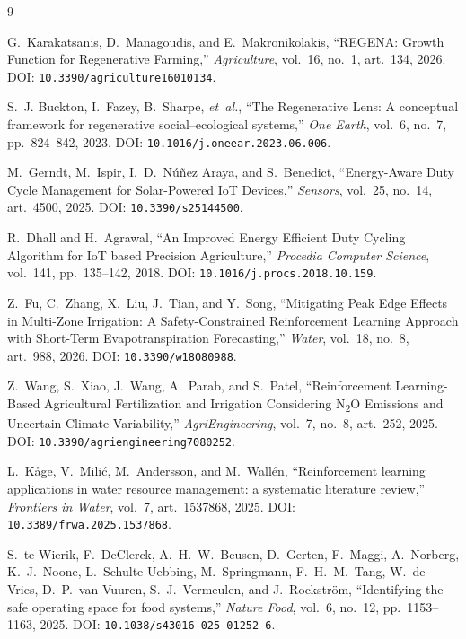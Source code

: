 \documentclass[11pt,a4paper]{article}
\begin{document}
\begin{thebibliography}{9}

G.~Karakatsanis, D.~Managoudis, and E.~Makronikolakis, ``REGENA: Growth Function for Regenerative Farming,'' \emph{Agriculture}, vol.~16, no.~1, art.~134, 2026. DOI: \texttt{10.3390/agriculture16010134}.

S.~J. Buckton, I.~Fazey, B.~Sharpe, \emph{et~al.}, ``The Regenerative Lens: A conceptual framework for regenerative social--ecological systems,'' \emph{One Earth}, vol.~6, no.~7, pp.~824--842, 2023. DOI: \texttt{10.1016/j.oneear.2023.06.006}.

M.~Gerndt, M.~Ispir, I.~D.~N{\'u}{\~n}ez Araya, and S.~Benedict, ``Energy-Aware Duty Cycle Management for Solar-Powered IoT Devices,'' \emph{Sensors}, vol.~25, no.~14, art.~4500, 2025. DOI: \texttt{10.3390/s25144500}.

R.~Dhall and H.~Agrawal, ``An Improved Energy Efficient Duty Cycling Algorithm for IoT based Precision Agriculture,'' \emph{Procedia Computer Science}, vol.~141, pp.~135--142, 2018. DOI: \texttt{10.1016/j.procs.2018.10.159}.

Z.~Fu, C.~Zhang, X.~Liu, J.~Tian, and Y.~Song, ``Mitigating Peak Edge Effects in Multi-Zone Irrigation: A Safety-Constrained Reinforcement Learning Approach with Short-Term Evapotranspiration Forecasting,'' \emph{Water}, vol.~18, no.~8, art.~988, 2026. DOI: \texttt{10.3390/w18080988}.

Z.~Wang, S.~Xiao, J.~Wang, A.~Parab, and S.~Patel, ``Reinforcement Learning-Based Agricultural Fertilization and Irrigation Considering N\textsubscript{2}O Emissions and Uncertain Climate Variability,'' \emph{AgriEngineering}, vol.~7, no.~8, art.~252, 2025. DOI: \texttt{10.3390/agriengineering7080252}.

L.~K{\aa}ge, V.~Mili{\'c}, M.~Andersson, and M.~Wall{\'e}n, ``Reinforcement learning applications in water resource management: a systematic literature review,'' \emph{Frontiers in Water}, vol.~7, art.~1537868, 2025. DOI: \texttt{10.3389/frwa.2025.1537868}.

S.~te Wierik, F.~DeClerck, A.~H.~W.~Beusen, D.~Gerten, F.~Maggi, A.~Norberg, K.~J.~Noone, L.~Schulte-Uebbing, M.~Springmann, F.~H.~M.~Tang, W.~de Vries, D.~P.~van Vuuren, S.~J.~Vermeulen, and J.~Rockstr\"om, ``Identifying the safe operating space for food systems,'' \emph{Nature Food}, vol.~6, no.~12, pp.~1153--1163, 2025. DOI: \texttt{10.1038/s43016-025-01252-6}.


\end{thebibliography}
\end{document}
